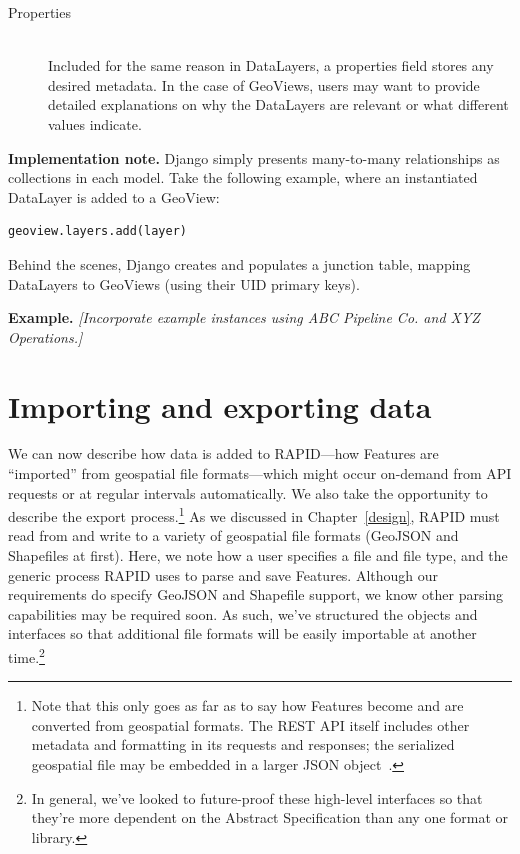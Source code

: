 \begin{description}
\item[Properties] \hfill \\
Included for the same reason in DataLayers, a properties field stores any desired metadata. In the case of GeoViews, users may want to provide detailed explanations on why the DataLayers are relevant or what different values indicate.

\end{description}

\textbf{Implementation note.} Django simply presents many-to-many relationships as collections in each model. Take the following example, where an instantiated DataLayer is added to a GeoView:

\begin{Verbatim}[samepage=true,baselinestretch=1,xleftmargin=12mm]
geoview.layers.add(layer)
\end{Verbatim}

Behind the scenes, Django creates and populates a junction table, mapping DataLayers to GeoViews (using their UID primary keys).

\textbf{Example.} \textit{[Incorporate example instances using ABC Pipeline Co. and XYZ Operations.]}

\section{Importing and exporting data}
We can now describe how data is added to RAPID---how Features are ``imported'' from geospatial file formats---which might occur on-demand from API requests or at regular intervals automatically. We also take the opportunity to describe the export process.\footnote{Note that this only goes as far as to say how Features become and are converted from geospatial formats. The REST API itself includes other metadata and formatting in its requests and responses; the serialized geospatial file may be embedded in a larger JSON object~\cite{Francis}.} As we discussed in Chapter~\ref{design}, RAPID must read from and write to a variety of geospatial file formats (GeoJSON and Shapefiles at first). Here, we note how a user specifies a file and file type, and the generic process RAPID uses to parse and save Features. Although our requirements do specify GeoJSON and Shapefile support, we know other parsing capabilities may be required soon. As such, we've structured the objects and interfaces so that additional file formats will be easily importable at another time.\footnote{In general, we've looked to future-proof these high-level interfaces so that they're more dependent on the Abstract Specification than any one format or library.}


